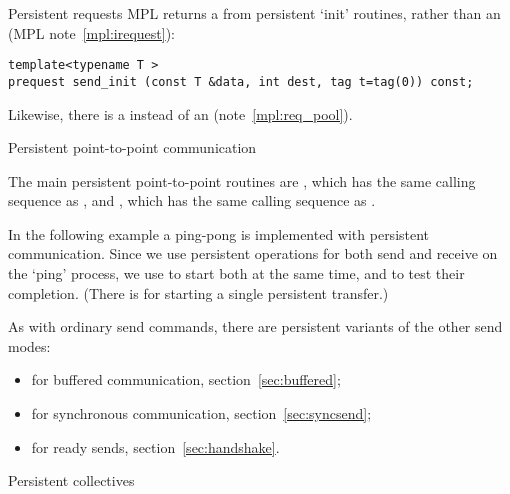 \begin{mplnote}{Persistent requests}
  MPL returns a 
  from persistent `init' routines, rather than an 
  (MPL note~\ref{mpl:irequest}):
\begin{lstlisting}
template<typename T >
prequest send_init (const T &data, int dest, tag t=tag(0)) const;
\end{lstlisting}
Likewise, there is a 
instead of an  (note~\ref{mpl:req_pool}).
\end{mplnote}

 {Persistent point-to-point communication}
\label{sec:persist-p2p}

The main persistent point-to-point routines are
, which has the same calling sequence as
, and , which has the same
calling sequence as .
  
In the following example a ping-pong is implemented with persistent communication.
Since we use persistent operations for both send and receive on the `ping' process,
we use  to start both at the same time,
and  to test their completion.
(There is  for starting a single persistent transfer.)
%  
{
  \def\snippetcodefraction{.45}
  \def\snippetlistfraction{.5}  
}
%

As with ordinary send commands, there are persistent variants
of the other send modes:
\begin{itemize}
\item
   for buffered communication,
  section~\ref{sec:buffered};
\item
   for synchronous communication,
  section~\ref{sec:syncsend};
\item
   for ready sends,
  section~\ref{sec:handshake}.
\end{itemize}


 {Persistent collectives}

